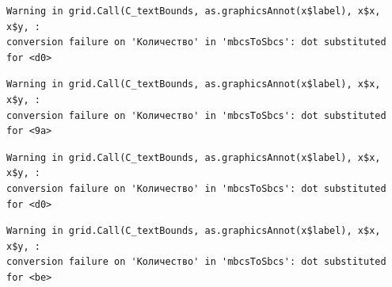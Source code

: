 \documentclass[
  letterpaper,
]{scrbook}
\newenvironment{Shaded}{}{}
\newcommand{\AttributeTok}[1]{\textcolor[rgb]{0.84,0.23,0.29}{#1}}
\newcommand{\ConstantTok}[1]{\textcolor[rgb]{0.00,0.36,0.77}{#1}}
\newcommand{\ControlFlowTok}[1]{\textcolor[rgb]{0.84,0.23,0.29}{#1}}
\newcommand{\DecValTok}[1]{\textcolor[rgb]{0.00,0.36,0.77}{#1}}
\newcommand{\FunctionTok}[1]{\textcolor[rgb]{0.44,0.26,0.76}{#1}}
\newcommand{\NormalTok}[1]{\textcolor[rgb]{0.14,0.16,0.18}{#1}}
\newcommand{\OtherTok}[1]{\textcolor[rgb]{0.44,0.26,0.76}{#1}}
\newcommand{\SpecialCharTok}[1]{\textcolor[rgb]{0.00,0.36,0.77}{#1}}
\newcommand{\StringTok}[1]{\textcolor[rgb]{0.01,0.18,0.38}{#1}}
\theoremstyle{definition}
\theoremstyle{remark}
\begin{document}
\begin{Shaded}
\end{Shaded}

\begin{verbatim}
Warning in grid.Call(C_textBounds, as.graphicsAnnot(x$label), x$x, x$y, :
conversion failure on 'Количество' in 'mbcsToSbcs': dot substituted for <d0>
\end{verbatim}

\begin{verbatim}
Warning in grid.Call(C_textBounds, as.graphicsAnnot(x$label), x$x, x$y, :
conversion failure on 'Количество' in 'mbcsToSbcs': dot substituted for <9a>
\end{verbatim}

\begin{verbatim}
Warning in grid.Call(C_textBounds, as.graphicsAnnot(x$label), x$x, x$y, :
conversion failure on 'Количество' in 'mbcsToSbcs': dot substituted for <d0>
\end{verbatim}

\begin{verbatim}
Warning in grid.Call(C_textBounds, as.graphicsAnnot(x$label), x$x, x$y, :
conversion failure on 'Количество' in 'mbcsToSbcs': dot substituted for <be>
\end{verbatim}
\end{document}
